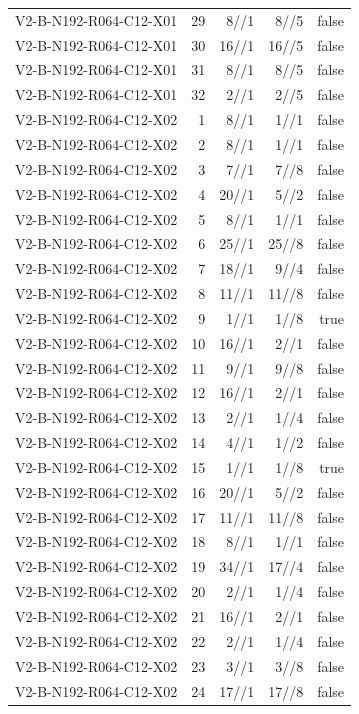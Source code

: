 {\begin{longtable}{lrrrr}
V2-B-N192-R064-C12-X01 & 29 & 8//1 & 8//5 & false \\
V2-B-N192-R064-C12-X01 & 30 & 16//1 & 16//5 & false \\
V2-B-N192-R064-C12-X01 & 31 & 8//1 & 8//5 & false \\
V2-B-N192-R064-C12-X01 & 32 & 2//1 & 2//5 & false \\
V2-B-N192-R064-C12-X02 & 1 & 8//1 & 1//1 & false \\
V2-B-N192-R064-C12-X02 & 2 & 8//1 & 1//1 & false \\
V2-B-N192-R064-C12-X02 & 3 & 7//1 & 7//8 & false \\
V2-B-N192-R064-C12-X02 & 4 & 20//1 & 5//2 & false \\
V2-B-N192-R064-C12-X02 & 5 & 8//1 & 1//1 & false \\
V2-B-N192-R064-C12-X02 & 6 & 25//1 & 25//8 & false \\
V2-B-N192-R064-C12-X02 & 7 & 18//1 & 9//4 & false \\
V2-B-N192-R064-C12-X02 & 8 & 11//1 & 11//8 & false \\
V2-B-N192-R064-C12-X02 & 9 & 1//1 & 1//8 & true \\
V2-B-N192-R064-C12-X02 & 10 & 16//1 & 2//1 & false \\
V2-B-N192-R064-C12-X02 & 11 & 9//1 & 9//8 & false \\
V2-B-N192-R064-C12-X02 & 12 & 16//1 & 2//1 & false \\
V2-B-N192-R064-C12-X02 & 13 & 2//1 & 1//4 & false \\
V2-B-N192-R064-C12-X02 & 14 & 4//1 & 1//2 & false \\
V2-B-N192-R064-C12-X02 & 15 & 1//1 & 1//8 & true \\
V2-B-N192-R064-C12-X02 & 16 & 20//1 & 5//2 & false \\
V2-B-N192-R064-C12-X02 & 17 & 11//1 & 11//8 & false \\
V2-B-N192-R064-C12-X02 & 18 & 8//1 & 1//1 & false \\
V2-B-N192-R064-C12-X02 & 19 & 34//1 & 17//4 & false \\
V2-B-N192-R064-C12-X02 & 20 & 2//1 & 1//4 & false \\
V2-B-N192-R064-C12-X02 & 21 & 16//1 & 2//1 & false \\
V2-B-N192-R064-C12-X02 & 22 & 2//1 & 1//4 & false \\
V2-B-N192-R064-C12-X02 & 23 & 3//1 & 3//8 & false \\
V2-B-N192-R064-C12-X02 & 24 & 17//1 & 17//8 & false \\

\end{longtable}}
